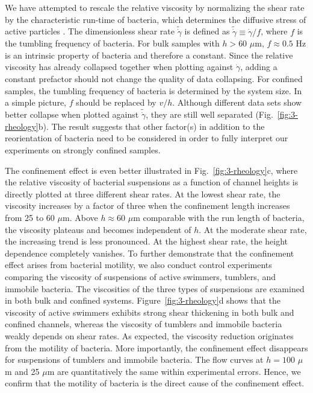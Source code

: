 We have attempted to rescale the relative viscosity by normalizing the shear rate by the characteristic run-time of
bacteria, which determines the diffusive stress of active particles \cite{Takatori2017}. The dimensionless shear rate $\tilde{\dot\gamma}$ is defined as $\tilde{\dot\gamma}\equiv \dot\gamma / f$, where $f$ is the tumbling frequency of bacteria. For bulk samples with $h > 60$ $\mu$m, $f \approx 0.5$ Hz is an intrinsic property of bacteria and therefore a constant. Since the relative viscosity has already collapsed together when plotting against $\dot\gamma$, adding a constant prefactor should not change the quality of data collapsing. For confined samples, the tumbling frequency of bacteria is determined by the system size. In a simple picture, $f$ should be replaced by $v/h$. Although different data sets show better collapse when plotted against $\tilde{\dot\gamma}$, they are still well separated (Fig.~\ref{fig:3-rheology}b). The result suggests that other factor(s) in addition
to the reorientation of bacteria need to be considered in order to fully interpret our experiments on strongly confined samples.

The confinement effect is even better illustrated in Fig.~\ref{fig:3-rheology}c, where the relative viscosity of bacterial suspensions as a function of channel heights is directly plotted at three different shear rates. At the lowest shear rate, the viscosity increases by a factor of three when the confinement length increases from 25 to 60 $\mu$m. Above $h \approx 60$ $\mu$m comparable with the run length of bacteria, the viscosity plateaus and becomes
independent of $h$. At the moderate shear rate, the increasing trend is less pronounced. At the highest shear rate, the height dependence completely vanishes. To further demonstrate that the confinement effect arises from bacterial motility, we also conduct control experiments comparing the viscosity of suspensions of active swimmers, tumblers, and immobile bacteria. The viscosities of the three types of suspensions are examined in both bulk and confined systems. Figure~\ref{fig:3-rheology}d shows that the viscosity of active swimmers exhibits strong shear thickening in both bulk and confined channels, whereas the viscosity of tumblers and immobile bacteria weakly depends on shear rates. As expected, the viscosity reduction originates from the motility of bacteria. More importantly, the confinement effect disappears for suspensions of tumblers and immobile bacteria. The flow curves at $h = 100$ $\mu$m and 25 $\mu$m are quantitatively the same within experimental errors. Hence, we confirm that the motility of bacteria is the direct cause of the confinement effect.

